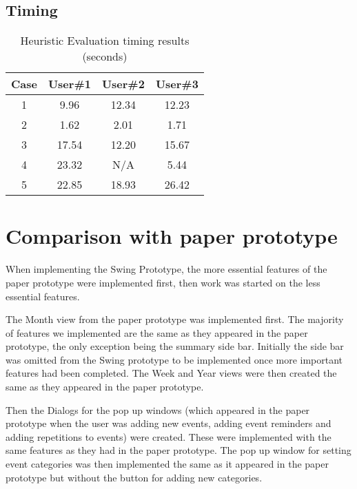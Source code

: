\documentclass{article}
\begin{document}
\subsection{Timing}

\begin{table}[ht]
\caption{Heuristic Evaluation timing results (seconds)} %
\centering %
\begin{tabular}{c c c c} %
\hline\hline %
Case & User\#1 & User\#2 & User\#3 \\ [0.5ex] %
\hline %
1 & 9.96 & 12.34 & 12.23 \\ %
2 & 1.62 & 2.01 & 1.71 \\
3 & 17.54 & 12.20 & 15.67 \\
4 & 23.32 & N/A & 5.44 \\
5 & 22.85 & 18.93 & 26.42 \\ [1ex] %
\hline %
\end{tabular}
\label{table:nonlin} %
\end{table}


\section{Comparison with paper prototype}

When implementing the Swing Prototype, the more essential features of the
paper prototype were implemented first, then work was started on the less
essential features.

The Month view from the paper prototype was implemented first. The
majority of features we implemented are the same as they appeared in the
paper prototype, the only exception being the summary side bar.
Initially the side bar was omitted from the Swing prototype to be
implemented once more important features had been completed.
The Week and Year views were then created the same as they appeared in 
the paper prototype.

Then the Dialogs for the pop up windows (which appeared in the paper
prototype when the user was adding new events, adding event
reminders and adding repetitions to events) were created. These were
implemented with the same features as they had in the paper prototype. 
The pop up window for setting event categories was then implemented the
same as it appeared in the paper prototype but without the button for 
adding new categories.
\end{document}
